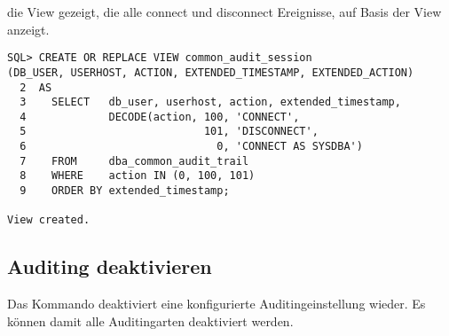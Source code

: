         die View  gezeigt, die alle connect
        und disconnect Ereignisse, auf Basis der View
           anzeigt.
        \begin{lstlisting}[caption={Eine eigene View für dba\_common\_audit\_trail},label=admin817,language=oracle_sql]
SQL> CREATE OR REPLACE VIEW common_audit_session
(DB_USER, USERHOST, ACTION, EXTENDED_TIMESTAMP, EXTENDED_ACTION)
  2  AS
  3    SELECT   db_user, userhost, action, extended_timestamp,
  4             DECODE(action, 100, 'CONNECT',
  5                            101, 'DISCONNECT',
  6                              0, 'CONNECT AS SYSDBA')
  7    FROM     dba_common_audit_trail
  8    WHERE    action IN (0, 100, 101)
  9    ORDER BY extended_timestamp;

View created.
        \end{lstlisting}
      \subsection{Auditing deaktivieren}
        Das Kommando  deaktiviert eine konfigurierte Auditingeinstellung wieder. Es kön\-nen damit alle Auditingarten deaktiviert werden.

